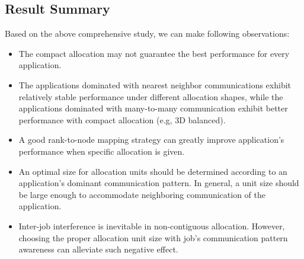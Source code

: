 \subsection{Result Summary}
\label{sec:summary}

Based on the above comprehensive study, we can make following observations:

\begin{itemize}

    \item The compact allocation may not guarantee the best performance for every application. 
    
    \item The applications dominated with nearest neighbor communications exhibit 
    relatively stable performance under different allocation shapes, 
    while the applications dominated with many-to-many communication exhibit 
    better performance with compact allocation (e.g, 3D balanced).
    
    \item A good rank-to-node mapping strategy can greatly improve 
    application's performance when specific allocation is given.
    
    \item An optimal size for allocation units should be determined 
    according to an application's dominant communication pattern. 
    In general, a unit size should be large enough to accommodate  
    neighboring communication of the application. 
    
    \item Inter-job interference is inevitable in non-contiguous allocation. 
    However, choosing the proper allocation unit size with job's communication 
    pattern awareness can alleviate such negative effect. 
    
\end{itemize}





